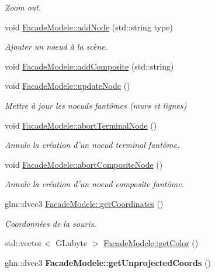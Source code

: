 \begin{DoxyCompactItemize}
\begin{DoxyCompactList}\small\item\em Zoom out. \end{DoxyCompactList}\item 
void \hyperlink{group__inf2990_ga22eeedd655650984efa7da6d3d2564eb}{Facade\-Modele\-::add\-Node} (std\-::string type)
\begin{DoxyCompactList}\small\item\em Ajouter un noeud à la scène. \end{DoxyCompactList}\item 
void \hyperlink{group__inf2990_ga84c93e92df125b294651c3bb04201624}{Facade\-Modele\-::add\-Composite} (std\-::string)
\item 
void \hyperlink{group__inf2990_ga3d780d2a98e5abe59033ba9791065d7d}{Facade\-Modele\-::update\-Node} ()
\begin{DoxyCompactList}\small\item\em Mettre à jour les noeuds fantômes (murs et lignes) \end{DoxyCompactList}\item 
void \hyperlink{group__inf2990_gaf1099ad811d94b7ede2572fbd3c7c89e}{Facade\-Modele\-::abort\-Terminal\-Node} ()
\begin{DoxyCompactList}\small\item\em Annule la création d'un noeud terminal fantôme. \end{DoxyCompactList}\item 
\hypertarget{group__inf2990_gaf17fbb34428b0e0a22ffcdc245e52d19}{void \hyperlink{group__inf2990_gaf17fbb34428b0e0a22ffcdc245e52d19}{Facade\-Modele\-::abort\-Composite\-Node} ()}\label{group__inf2990_gaf17fbb34428b0e0a22ffcdc245e52d19}

\begin{DoxyCompactList}\small\item\em Annule la création d'un noeud composite fantôme. \end{DoxyCompactList}\item 
glm\-::dvec3 \hyperlink{group__inf2990_ga4c28397e45d882d3d982ed68978e9e20}{Facade\-Modele\-::get\-Coordinates} ()
\begin{DoxyCompactList}\small\item\em Coordonnées de la souris. \end{DoxyCompactList}\item 
std\-::vector$<$ G\-Lubyte $>$ \hyperlink{group__inf2990_gaed1bb083cd47a1a5204c626f340e718f}{Facade\-Modele\-::get\-Color} ()
\item 
\hypertarget{group__inf2990_ga219c55018f92fd2b779c06c7f7c1965e}{glm\-::dvec3 {\bfseries Facade\-Modele\-::get\-Unprojected\-Coords} ()}\label{group__inf2990_ga219c55018f92fd2b779c06c7f7c1965e}


\end{DoxyCompactItemize}
